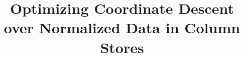 \documentclass{vldb}
\begin{document}

\title{Optimizing Coordinate Descent over Normalized Data in Column Stores}



%
%
%
%


\author{
%
%
}
\end{document}
